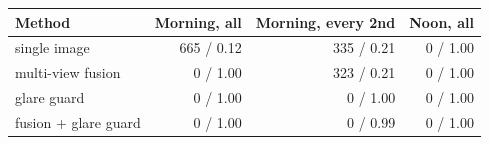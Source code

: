 \begin{tabular}{lrrr}
\toprule
Method & Morning, all & Morning, every 2nd & Noon, all \\
\midrule
single image & 665 / 0.12 & 335 / 0.21 & 0 / 1.00 \\
multi-view fusion & 0 / 1.00 & 323 / 0.21 & 0 / 1.00 \\
glare guard & 0 / 1.00 & 0 / 1.00 & 0 / 1.00 \\
fusion + glare guard & 0 / 1.00 & 0 / 0.99 & 0 / 1.00 \\
\bottomrule
\end{tabular}
